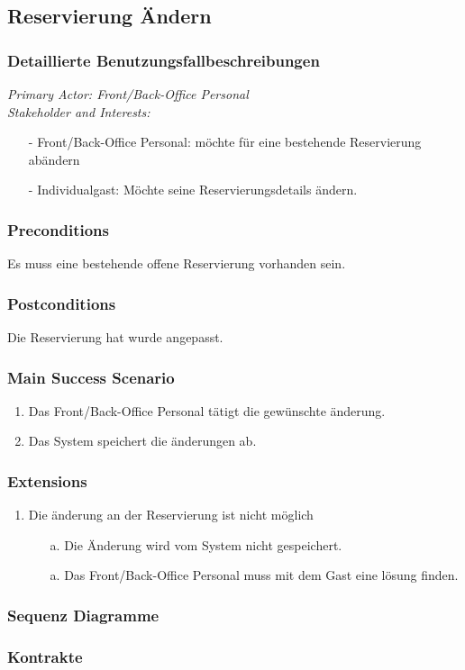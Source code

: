 \documentclass[./detailed_overview_usecases.tex]{subfiles}
\begin{document}
    \subsection{Reservierung Ändern}
    \subsubsection{Detaillierte Benutzungsfallbeschreibungen}
    \textit{Primary Actor: Front/Back-Office Personal}
    \\
    \textit{Stakeholder and Interests:}
    \begin{itemize}
        \item[-] Front/Back-Office Personal: möchte für eine bestehende Reservierung abändern
        \item[-] Individualgast: Möchte seine Reservierungsdetails ändern.
    \end{itemize}

    \subsubsection*{Preconditions}
    Es muss eine bestehende offene Reservierung vorhanden sein.

    \subsubsection*{Postconditions}
    Die Reservierung hat wurde angepasst.

    \subsubsection*{Main Success Scenario}
    \begin{enumerate}
        \item Das Front/Back-Office Personal tätigt die gewünschte änderung.
        \item Das System speichert die änderungen ab.
    \end{enumerate}

    \subsubsection*{Extensions}
    \begin{enumerate}
        \item Die änderung an der Reservierung ist nicht möglich
        \begin{itemize}
            \item[a.] Die Änderung wird vom System nicht gespeichert.
            \item[a.] Das Front/Back-Office Personal muss mit dem Gast eine lösung finden.
        \end{itemize}
    \end{enumerate}
    \subsubsection{Sequenz Diagramme}
    \subsubsection{Kontrakte}
\end{document}

